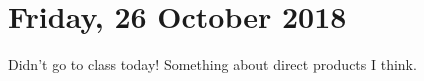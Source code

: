 \section{Friday, 26 October 2018}

Didn't go to class today! Something about direct products I think.